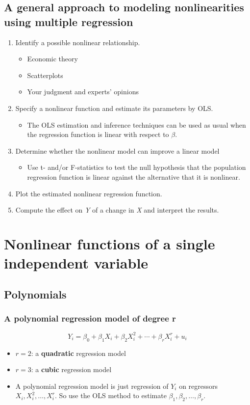 \documentclass[a4paper,11pt]{article}
\begin{document}
\subsection{A general approach to modeling nonlinearities using multiple regression}
\label{sec:orgd043fd6}
\begin{enumerate}
\item Identify a possible nonlinear relationship.
\begin{itemize}
\item Economic theory
\item Scatterplots
\item Your judgment and experts' opinions
\end{itemize}
\item Specify a nonlinear function and estimate its parameters by OLS.
\begin{itemize}
\item The OLS estimation and inference techniques can be used as usual
when the regression function is linear with respect to \(\beta\).
\end{itemize}
\item Determine whether the nonlinear model can improve a linear model
\begin{itemize}
\item Use t- and/or F-statistics to test the null hypothesis that the
population regression function is linear against the alternative
that it is nonlinear.
\end{itemize}
\item Plot the estimated nonlinear regression function.
\item Compute the effect on \emph{Y} of a change in \emph{X} and interpret the
results.
\end{enumerate}


\section{Nonlinear functions of a single independent variable}
\label{sec:org539af9c}
\subsection{Polynomials}
\label{sec:org1b44132}
\subsubsection*{A polynomial regression model of degree r}
\label{sec:orgbb8ed1c}
\begin{equation}
\label{eq:poly-r}
Y_i = \beta_0 + \beta_1 X_i + \beta_2 X_i^2 + \cdots + \beta_r X_i^r + u_i
\end{equation}
\begin{itemize}
\item \(r = 2\): a \textbf{quadratic} regression model
\item \(r = 3\): a \textbf{cubic} regression model
\item A polynomial regression model is just regression of \(Y_i\) on
regressors \(X_i, X_i^2, \ldots, X_i^r\). So use the OLS method to
estimate \(\beta_1, \beta_2, \ldots, \beta_r\).
\end{itemize}
\end{document}

